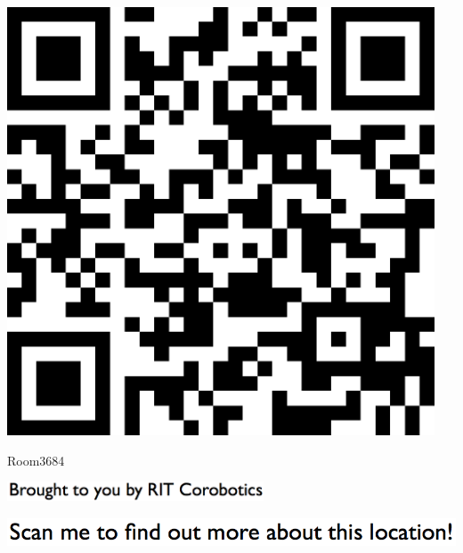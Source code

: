 \documentclass[letterpaper]{article}
\begin{document}
 \begingroup 
 \centerline{\includegraphics[scale=1,width=5in,height=5in]{Room3684.png}} 
 \endgroup 
 \vspace*{\fill} 

 \hfill{\small Room3684} 

  \vspace{0.7in} 
 
 \centerline{\includegraphics[scale=1,width=3in]{text-bottom.png}} 
 
 \pagebreak 
{} 
 \vspace*{\fill} 
 
  \centerline{\includegraphics[scale=1,width=6in]{text-top.png}} 
 
 \vspace{0.5in} 
 
\end{document}
